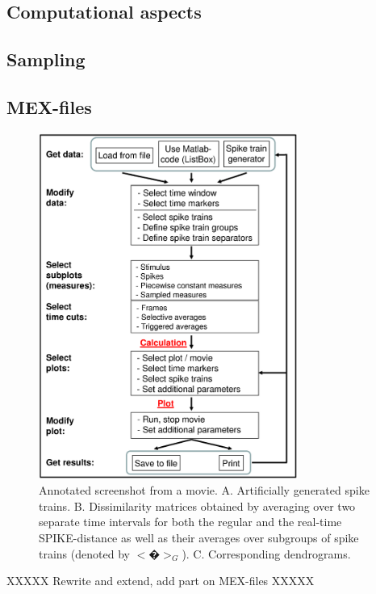 \documentclass[10pt,twocolumn]{elsart5p}
\begin{document}
\subsection{\label{ss:Computational-aspects} Computational aspects}

\subsection{\label{sss:Sampling} Sampling}

\subsection{\label{sss:MEX-files} MEX-files}


%
\begin{figure}
    \includegraphics[width=85mm]{Fig3-SPIKY-Flowchart.eps}
    \caption{\abb\label{fig:Fig3-SPIKY-Flowchart} Annotated screenshot from a movie.   A. Artificially generated spike trains.   B. Dissimilarity matrices obtained by averaging over two separate time intervals for both the regular and the real-time SPIKE-distance as well as their averages over subgroups of spike trains (denoted by $<�>_G$).   C. Corresponding dendrograms.}
\end{figure}

XXXXX Rewrite and extend, add part on MEX-files XXXXX
\end{document}
